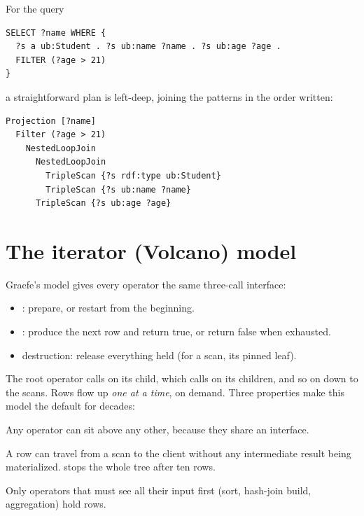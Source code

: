 For the query

\begin{lstlisting}
SELECT ?name WHERE {
  ?s a ub:Student . ?s ub:name ?name . ?s ub:age ?age .
  FILTER (?age > 21)
}
\end{lstlisting}

a straightforward plan is left-deep, joining the patterns in the order written:

\begin{lstlisting}
Projection [?name]
  Filter (?age > 21)
    NestedLoopJoin
      NestedLoopJoin
        TripleScan {?s rdf:type ub:Student}
        TripleScan {?s ub:name ?name}
      TripleScan {?s ub:age ?age}
\end{lstlisting}

\section{The iterator (Volcano) model}

Graefe's  model \cite{graefe} gives every operator the same
three-call interface:

\begin{itemize}
\item {}: prepare, or restart from the beginning.
\item {}: produce the next row and return true, or return false when exhausted.
\item destruction: release everything held (for a scan, its pinned leaf).
\end{itemize}

The root operator calls  on its child, which calls  on
its children, and so on down to the scans. Rows flow up \emph{one at a time},
on demand. Three properties make this model the default for decades:

\begin{description}[leftmargin=1.2em]
\item[Composability.] Any operator can sit above any other, because they share an interface.
\item[Pipelining.] A row can travel from a scan to the client without any intermediate result being materialized.  stops the whole tree after ten rows.
\item[Bounded memory.] Only operators that must see all their input first (sort, hash-join build, aggregation) hold rows.
\end{description}

